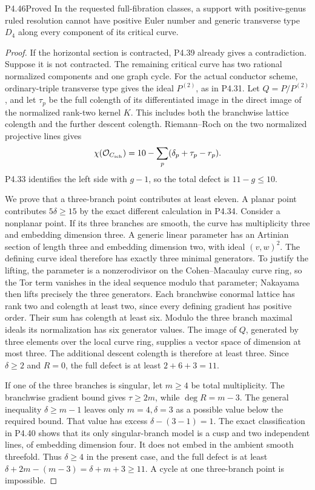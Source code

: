 \begin{statement}{P4.46}{Proved}
In the requested full-fibration classes, a support with
positive-genus ruled resolution cannot have positive
Euler number and generic transverse type $D_4$ along
every component of its critical curve.
\end{statement}
\begin{proof}
If the horizontal section is contracted, P4.39 already
gives a contradiction. Suppose it is not contracted.
The remaining critical curve has two rational normalized
components and one graph cycle. For the actual
conductor scheme, ordinary-triple transverse type gives
the ideal $P^{(2)}$, as in P4.31. Let $Q=P/P^{(2)}$,
and let $\tau_p$ be the full colength of its differentiated
image in the direct image of the normalized rank-two
kernel $K$. This includes both the branchwise lattice
colength and the further descent colength. Riemann--Roch
on the two normalized projective lines gives
\[
 \chi(\mathcal O_{C_{\rm sch}})
       =10-\sum_p(\delta_p+\tau_p-r_p).
\]
P4.33 identifies the left side with $g-1$, so the total
defect is $11-g\le10$.

We prove that a three-branch point contributes at least
eleven. A planar point contributes $5\delta\ge15$ by
the exact different calculation in P4.34. Consider a
nonplanar point. If its three branches are smooth, the
curve has multiplicity three and embedding dimension
three. A generic linear parameter has an Artinian
section of length three and embedding dimension two,
with ideal $(v,w)^2$. The defining curve ideal therefore
has exactly three minimal generators. To justify the
lifting, the parameter is a nonzerodivisor on the
Cohen--Macaulay curve ring, so the Tor term vanishes in
the ideal sequence modulo that parameter; Nakayama
then lifts precisely the three generators.
Each branchwise conormal lattice has rank two and
colength at least two, since every defining gradient
has positive order. Their sum has colength at least
six. Modulo the three branch maximal ideals its
normalization has six generator values. The image of
$Q$, generated by three elements over the local curve
ring, supplies a vector space of dimension at most
three. The additional descent colength is therefore
at least three. Since $\delta\ge2$ and $R=0$, the
full defect is at least $2+6+3=11$.

If one of the three branches is singular, let $m\ge4$
be total multiplicity. The branchwise gradient bound
gives $\tau\ge2m$, while $\deg R=m-3$.
The general inequality $\delta\ge m-1$ leaves only
$m=4,\delta=3$ as a possible value below the required
bound. That value has excess $\delta-(3-1)=1$.
The exact classification in P4.40 shows that its only
singular-branch model is a cusp and two independent
lines, of embedding dimension four. It does not embed
in the ambient smooth threefold. Thus $\delta\ge4$
in the present case, and the full defect is at least
$\delta+2m-(m-3)=\delta+m+3\ge11$.
A cycle at one three-branch point is impossible.


\end{proof}
